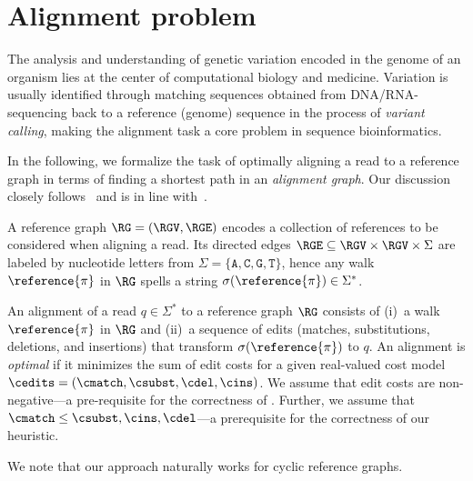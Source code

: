 \section{Alignment problem}

The analysis and understanding of genetic variation encoded in the genome of an
organism lies at the center of computational biology and medicine. Variation is
usually identified through matching sequences obtained from DNA/RNA-sequencing
back to a reference (genome) sequence in the process of \emph{variant calling},
making the alignment task a core problem in sequence bioinformatics.

%
In the following, we formalize the task of optimally aligning a read to a
reference graph in terms of finding a shortest path in an \emph{alignment
graph}. Our discussion closely follows~\citep{ivanov2020astarix} and is in line
with~\citep{rautiainen_aligning_2017}.

%
A reference graph $\RG=(\RGV,\RGE)$ encodes a collection of references to be
considered when aligning a read. Its directed edges $\RGE \subseteq \RGV \times
\RGV \times \Sigma$ are labeled by nucleotide letters from $\Sigma =
\{\texttt{A},\texttt{C},\texttt{G},\texttt{T}\}$, hence any walk
$\reference{\pi}$ in $\RG$ spells a string $\sigma(\reference{\pi}) \in
\Sigma^*$.

An alignment of a read $q \in \Sigma^*$ to a reference graph $\RG$ consists of
(i)~a walk $\reference{\pi}$ in $\RG$ and (ii)~a sequence of edits (matches,
substitutions, deletions, and insertions) that transform
$\sigma(\reference{\pi})$ to $q$. An alignment is \emph{optimal} if it minimizes
the sum of edit costs for a given real-valued cost model $\cedits = (\cmatch,
\csubst,\cdel, \cins)$.
%
We assume that edit costs are non-negative---a pre-requisite for the correctness
of \A. Further, we assume that $\cmatch \leq \csubst, \cins, \cdel$---a
prerequisite for the correctness of our heuristic.

We note that our approach naturally works for cyclic reference graphs.

